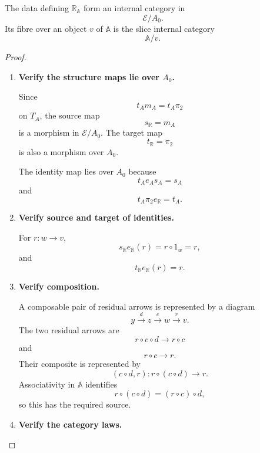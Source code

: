 \begin{proposition}
\label{prop:residual-fibres-in-slice}
    The data defining \(\mathbb R_{\mathbb A}\) form an internal category in
    \[
        \mathcal E/A_0.
    \]
    Its fibre over an object \(v\) of \(\mathbb A\) is the slice internal
    category
    \[
        \mathbb A/v.
    \]
\end{proposition}
\begin{proof}
    \leavevmode
    \begin{enumerate}
        \item \textbf{Verify the structure maps lie over \(A_0\).}

        Since
        \[
            t_Am_A=t_A\pi_2
        \]
        on \(T_A\), the source map
        \[
            s_{\mathbb R}=m_A
        \]
        is a morphism in \(\mathcal E/A_0\). The target map
        \[
            t_{\mathbb R}=\pi_2
        \]
        is also a morphism over \(A_0\).

        The identity map lies over \(A_0\) because
        \[
            t_Ae_As_A=s_A
        \]
        and
        \[
            t_A\pi_2e_{\mathbb R}
            =
            t_A.
        \]

        \item \textbf{Verify source and target of identities.}

        For \(r:w\to v\),
        \[
            s_{\mathbb R}e_{\mathbb R}(r)
            =
            r\circ1_w
            =
            r,
        \]
        and
        \[
            t_{\mathbb R}e_{\mathbb R}(r)=r.
        \]

        \item \textbf{Verify composition.}

        A composable pair of residual arrows is represented by a diagram
        \[
            y\xrightarrow{d}z\xrightarrow{c}w\xrightarrow{r}v.
        \]
        The two residual arrows are
        \[
            r\circ c\circ d\longrightarrow r\circ c
        \]
        and
        \[
            r\circ c\longrightarrow r.
        \]
        Their composite is represented by
        \[
            (c\circ d,r):
            r\circ(c\circ d)\longrightarrow r.
        \]
        Associativity in \(\mathbb A\) identifies
        \[
            r\circ(c\circ d)
            =
            (r\circ c)\circ d,
        \]
        so this has the required source.

        \item \textbf{Verify the category laws.}


\end{enumerate}
\end{proof}
